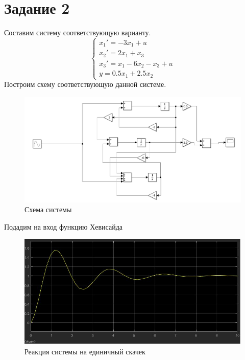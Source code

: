 \documentclass[a4paper, 12pt]{article}
\begin{document}
        \section{Задание 2}
        Составим систему соответствующую варианту.
        $$\begin{cases}
            x_1' = -3x_1 + u\\
            x_2' = 2x_1 + x_3\\
            x_3' = x_1 -6x_2 - x_3 + u\\
            y = 0.5x_1+ 2.5x_2
         \end{cases}$$
         Построим схему соответствующую данной системе.
         \begin{figure}[H]
            \centering
            \includegraphics[scale=0.4]{2.0.png}
            \captionsetup{skip=0pt}
            \caption{Схема системы}
            \label{fig:5imspdf}
        \end{figure}
        Подадим на вход функцию Хевисайда
        \begin{figure}[H]
            \centering
            \includegraphics[scale=0.4]{2.1.jpg}
            \captionsetup{skip=0pt}
            \caption{Реакция системы на единичный скачек}
            \label{fig:5imspdf}
        \end{figure}
\end{document}
